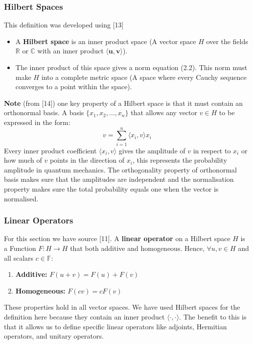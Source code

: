 \subsubsection{Hilbert Spaces}
This definition was developed using [13]
\begin{itemize}
    \item A \textbf{Hilbert space} is an inner product space (A vector space $H$ over the fields \( \mathbb{R} \) or \( \mathbb{C} \) with an inner product $\langle \mathbf{u}, \mathbf{v} \rangle$).
    \item The inner product of this space gives a norm equation (2.2). This norm must make $H$ into a complete metric space (A space where every Cauchy sequence converges to a point within the space).
\end{itemize}
\noindent \textbf{Note} (from [14]) one key property of a Hilbert space is that it must contain an orthonormal basis. A basis \( \{ x_1, x_2, \dots, x_n \} \) that allows any vector \( v \in H \) to be expressed in the form:
\begin{equation}
v = \sum_{i=1}^n \langle x_i, v \rangle x_i
\end{equation}
Every inner product coefficient \( \langle x_i, v \rangle \) gives the amplitude of \( v \) in respect to \( x_i \) or how much of \( v \) points in the direction of \( x_i \), this represents the probability amplitude in quantum mechanics. The orthogonality property of orthonormal basis makes sure that the amplitudes are independent and the normalisation property makes sure the total probability equals one when the vector is normalised.





\subsubsection{Linear Operators}
For this section we have source [11].
A \textbf{linear operator} on a Hilbert space \( H \) is a Function \( F: H \to H \) that both additive and homogeneous. Hence,  \( \forall u, v \in H \) and all scalars \( c \in \mathbb{F} \):

\begin{enumerate}
    \item \textbf{Additive:} \( F(u + v) = F(u) + F(v) \)
    \item \textbf{Homogeneous:} \( F(c v) = c F(v) \)
\end{enumerate}

\noindent These properties hold in all vector spaces. We have used Hilbert spaces for the definition here because they contain an inner product \( \langle \cdot, \cdot \rangle \). The benefit to this is that it allows us to define specific linear operators like adjoints, Hermitian operators, and unitary operators.


